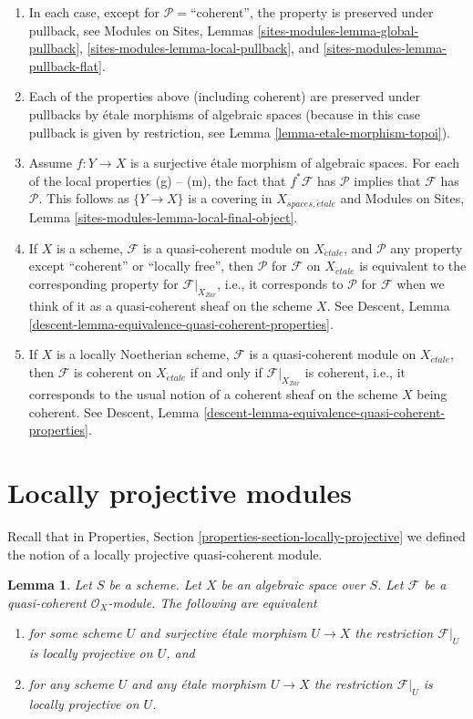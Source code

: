 \documentclass{stacks-project}
\theoremstyle{plain}
\newtheorem{lemma}[subsection]{Lemma}
\theoremstyle{definition}
\theoremstyle{remark}
\numberwithin{equation}{subsection}
\def\etale{{\acute{e}tale}}
\begin{document}
\begin{enumerate}
\item In each case, except for $\mathcal{P}=$``coherent'', the property
is preserved under pullback, see
Modules on Sites, Lemmas \ref{sites-modules-lemma-global-pullback},
\ref{sites-modules-lemma-local-pullback}, and
\ref{sites-modules-lemma-pullback-flat}.
\item Each of the properties above (including coherent) are preserved under
pullbacks by \'etale morphisms of algebraic spaces (because in this
case pullback is given by restriction, see
Lemma \ref{lemma-etale-morphism-topoi}).
\item Assume $f : Y \to X$ is a surjective \'etale morphism of algebraic
spaces. For each of the local properties (g) -- (m), the fact that
$f^*\mathcal{F}$ has $\mathcal{P}$ implies that $\mathcal{F}$ has
$\mathcal{P}$. This follows as $\{Y \to X\}$ is a covering in
$X_{spaces, \etale}$ and
Modules on Sites, Lemma \ref{sites-modules-lemma-local-final-object}.
\item If $X$ is a scheme, $\mathcal{F}$ is a quasi-coherent module
on $X_\etale$, and $\mathcal{P}$ any property except ``coherent'' or
``locally free'', then $\mathcal{P}$ for $\mathcal{F}$ on $X_\etale$
is equivalent to the corresponding property for
$\mathcal{F}|_{X_{Zar}}$, i.e., it corresponds to $\mathcal{P}$
for $\mathcal{F}$ when we think of it as a quasi-coherent sheaf
on the scheme $X$. See
Descent, Lemma \ref{descent-lemma-equivalence-quasi-coherent-properties}.
\item If $X$ is a locally Noetherian scheme, $\mathcal{F}$ is a
quasi-coherent module on $X_\etale$, then $\mathcal{F}$
is coherent on $X_\etale$ if and only if
$\mathcal{F}|_{X_{Zar}}$ is coherent, i.e., it corresponds to
the usual notion of a coherent sheaf on the scheme $X$ being
coherent. See
Descent, Lemma \ref{descent-lemma-equivalence-quasi-coherent-properties}.
\end{enumerate}



\section{Locally projective modules}
\label{section-locally-projective}

\noindent
Recall that in
Properties, Section \ref{properties-section-locally-projective}
we defined the notion of a locally projective
quasi-coherent module.

\begin{lemma}
\label{lemma-locally-projective}
Let $S$ be a scheme. Let $X$ be an algebraic space over $S$.
Let $\mathcal{F}$ be a quasi-coherent $\mathcal{O}_X$-module.
The following are equivalent
\begin{enumerate}
\item for some scheme $U$ and surjective \'etale morphism
$U \to X$ the restriction $\mathcal{F}|_U$ is locally projective
on $U$, and
\item for any scheme $U$ and any \'etale morphism
$U \to X$ the restriction $\mathcal{F}|_U$ is locally projective
on $U$.
\end{enumerate}
\end{lemma}
\end{document}
